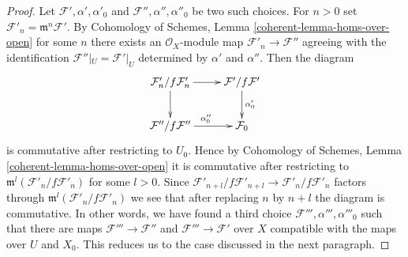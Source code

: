 \begin{proof}
Let $\mathcal{F}', \alpha', \alpha'_0$ and
$\mathcal{F}'', \alpha'', \alpha''_0$ be two such choices.
For $n > 0$ set $\mathcal{F}'_n = \mathfrak m^n \mathcal{F}'$.
By Cohomology of Schemes, Lemma \ref{coherent-lemma-homs-over-open}
for some $n$
there exists an $\mathcal{O}_X$-module map $\mathcal{F}'_n \to \mathcal{F}''$
agreeing with the identification
$\mathcal{F}''|_U = \mathcal{F}'|_U$ determined by $\alpha'$ and $\alpha''$.
Then the diagram
$$
\xymatrix{
\mathcal{F}'_n/f\mathcal{F}'_n \ar[r] \ar[d] &
\mathcal{F}'/f\mathcal{F}' \ar[d]^{\alpha_0'} \\
\mathcal{F}''/f\mathcal{F}'' \ar[r]^{\alpha_0''} &
\mathcal{F}_0
}
$$
is commutative after restricting to $U_0$. Hence by
Cohomology of Schemes, Lemma \ref{coherent-lemma-homs-over-open}
it is commutative after restricting to
$\mathfrak m^l(\mathcal{F}'_n/f\mathcal{F}'_n)$ for some $l > 0$. Since
$\mathcal{F}'_{n + l}/f\mathcal{F}'_{n + l} \to \mathcal{F}'_n/f\mathcal{F}'_n$
factors through $\mathfrak m^l(\mathcal{F}'_n/f\mathcal{F}'_n)$
we see that after replacing $n$ by $n + l$ the diagram
is commutative. In other words, we have found a third choice
$\mathcal{F}''', \alpha''', \alpha'''_0$
such that there are maps $\mathcal{F}''' \to \mathcal{F}''$
and $\mathcal{F}''' \to \mathcal{F}'$ over $X$
compatible with the maps over $U$ and $X_0$. This reduces us to
the case discussed in the next paragraph.


\end{proof}
